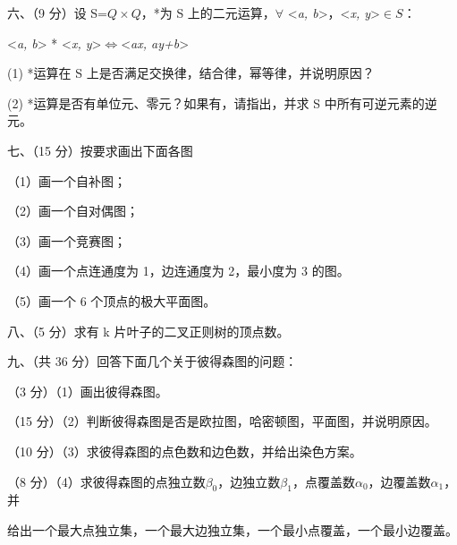 \documentclass[fontset=exam]{exam-zh}
\begin{document}

六、（9 分）设 S=\(Q \times Q\)，*为 S 上的二元运算，\(\forall\) \textless{}\emph{a, b}\textgreater，\textless{}\emph{x, y}\textgreater{}\(\in S\)：

\textless{}\emph{a, b}\textgreater{} * \textless{}\emph{x, y}\textgreater{}\(\Leftrightarrow\)\textless{}\emph{ax, ay+b}\textgreater{}

(1) *运算在 S 上是否满足交换律，结合律，幂等律，并说明原因？

(2) *运算是否有单位元、零元？如果有，请指出，并求 S 中所有可逆元素的逆元。


七、（15 分）按要求画出下面各图

（1）画一个自补图；

（2）画一个自对偶图；

（3）画一个竞赛图；

（4）画一个点连通度为 1，边连通度为 2，最小度为 3 的图。

（5）画一个 6 个顶点的极大平面图。


八、（5 分）求有 k 片叶子的二叉正则树的顶点数。


九、（共 36 分）回答下面几个关于彼得森图的问题：

（3 分）（1）画出彼得森图。

（15 分）（2）判断彼得森图是否是欧拉图，哈密顿图，平面图，并说明原因。

（10 分）（3）求彼得森图的点色数和边色数，并给出染色方案。

（8 分）（4）求彼得森图的点独立数\(\beta_{0}\)，边独立数\(\beta_{1}\)，点覆盖数\(\alpha_{0}\)，边覆盖数\(\alpha_{1}\)，并

给出一个最大点独立集，一个最大边独立集，一个最小点覆盖，一个最小边覆盖。
\end{document}
